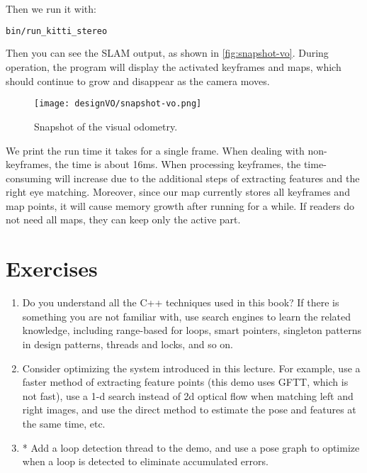 Then we run it with:
\begin{lstlisting}[language=sh,caption=Terminal input:]
bin/run_kitti_stereo
\end{lstlisting}
Then you can see the SLAM output, as shown in \autoref{fig:snapshot-vo}. During operation, the program will display the activated keyframes and maps, which should continue to grow and disappear as the camera moves.

\begin{figure}[!htp]
	\centering    
	\texttt{[image: designVO/snapshot-vo.png]}\\
	\caption{Snapshot of the visual odometry.}
	\label{fig:snapshot-vo}
\end{figure}

We print the run time it takes for a single frame. When dealing with non-keyframes, the time is about 16ms. When processing keyframes, the time-consuming will increase due to the additional steps of extracting features and the right eye matching. Moreover, since our map currently stores all keyframes and map points, it will cause memory growth after running for a while. If readers do not need all maps, they can keep only the active part.

\section*{Exercises}
\begin{enumerate}
	\item Do you understand all the C++ techniques used in this book? If there is something you are not familiar with, use search engines to learn the related knowledge, including range-based for loops, smart pointers, singleton patterns in design patterns, threads and locks, and so on.
	\item Consider optimizing the system introduced in this lecture. For example, use a faster method of extracting feature points (this demo uses GFTT, which is not fast), use a 1-d search instead of 2d optical flow when matching left and right images, and use the direct method to estimate the pose and features at the same time, etc.
	\item* Add a loop detection thread to the demo, and use a pose graph to optimize when a loop is detected to eliminate accumulated errors.
\end{enumerate}


